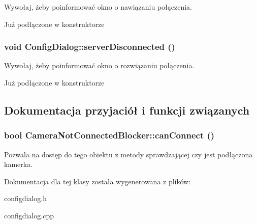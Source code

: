 Wywołaj, żeby poinformować okno o nawiązaniu połączenia. 

Już podłączone w konstruktorze \hypertarget{class_config_dialog_a7782fa76c40b70438677baff0c2622f2}{
\subsubsection[{serverDisconnected}]{\setlength{\rightskip}{0pt plus 5cm}void ConfigDialog::serverDisconnected ()}}
\label{class_config_dialog_a7782fa76c40b70438677baff0c2622f2}


Wywołaj, żeby poinformować okno o rozwiązaniu połączenia. 

Już podłączone w konstruktorze 

\subsection{Dokumentacja przyjaciół i funkcji związanych}
\hypertarget{class_config_dialog_a3b0963bb150b18a9cbd3b46187f7ea26}{
\subsubsection[{CameraNotConnectedBlocker::canConnect}]{\setlength{\rightskip}{0pt plus 5cm}bool CameraNotConnectedBlocker::canConnect ()}}
\label{class_config_dialog_a3b0963bb150b18a9cbd3b46187f7ea26}
Pozwala na dostęp do tego obiektu z metody sprawdzającej czy jest podłączona kamerka. 

Dokumentacja dla tej klasy została wygenerowana z plików:\begin{DoxyCompactItemize}
\item 
configdialog.h\item 
configdialog.cpp\end{DoxyCompactItemize}
